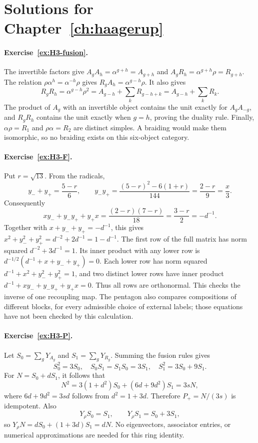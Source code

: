 \section{Solutions for Chapter~\ref{ch:haagerup}}

\paragraph{Exercise~\ref{ex:H3-fusion}.}
\label{sol:ex:H3-fusion}
The invertible factors give
$A_gA_h=\alpha^{g+h}=A_{g+h}$ and
$A_gR_h=\alpha^{g+h}\rho=R_{g+h}$.
The relation $\rho\alpha^h=\alpha^{-h}\rho$ gives
$R_gA_h=\alpha^{g-h}\rho$.  It also gives
\[
 R_gR_h=\alpha^{g-h}\rho^2
 =A_{g-h}+\sum_kR_{g-h+k}
 =A_{g-h}+\sum_kR_k.
\]
The product of $A_g$ with an invertible object contains the unit
exactly for $A_gA_{-g}$, and $R_gR_h$ contains the unit
exactly when $g=h$, proving the duality rule.  Finally,
$\alpha\rho=R_1$ and $\rho\alpha=R_2$ are distinct simples.
A braiding would make them isomorphic, so no braiding exists on
this six-object category.



\paragraph{Exercise~\ref{ex:H3-F}.}
\label{sol:ex:H3-F}
Put $r=\sqrt{13}$. From the radicals,
\[
 y_-+y_+=\frac{5-r}{6},\qquad
 y_-y_+=\frac{(5-r)^2-6(1+r)}{144}
          =\frac{2-r}{9}=\frac{x}{3}.
\]
Consequently
\[
 xy_-+y_-y_++y_+x
 =\frac{(2-r)(7-r)}{18}
 =\frac{3-r}{2}=-d^{-1}.
\]
Together with $x+y_-+y_+=-d^{-1}$, this gives
$x^2+y_-^2+y_+^2=d^{-2}+2d^{-1}=1-d^{-1}$.
The first row of the full matrix has norm squared
$d^{-2}+3d^{-1}=1$. Its inner product with any lower row is
$d^{-1/2}(d^{-1}+x+y_-+y_+)=0$. Each lower row has norm
squared $d^{-1}+x^2+y_-^2+y_+^2=1$, and two distinct lower
rows have inner product $d^{-1}+xy_-+y_-y_++y_+x=0$.
Thus all rows are orthonormal. This checks the inverse of one
recoupling map. The pentagon also compares compositions of
different blocks, for every admissible choice of external labels;
those equations have not been checked by this calculation.



\paragraph{Exercise~\ref{ex:H3-P}.}
\label{sol:ex:H3-P}
Let $S_0=\sum_gY_{A_g}$ and $S_1=\sum_gY_{R_g}$.  Summing
the fusion rules gives
\[
 S_0^2=3S_0,\quad S_0S_1=S_1S_0=3S_1,\quad
 S_1^2=3S_0+9S_1.
\]
For $N=S_0+dS_1$, it follows that
\[
 N^2=3(1+d^2)S_0+(6d+9d^2)S_1=3sN,
\]
where $6d+9d^2=3sd$ follows from $d^2=1+3d$.
Therefore $P_+=N/(3s)$ is idempotent.  Also
\[
 Y_\rho S_0=S_1,\qquad
 Y_\rho S_1=S_0+3S_1,
\]
so $Y_\rho N=dS_0+(1+3d)S_1=dN$.
No eigenvectors, associator entries, or numerical approximations
are needed for this ring identity.




